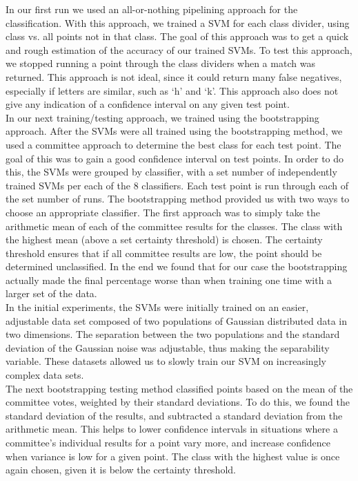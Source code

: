 \documentclass[journal]{IEEEtran}
\begin{document}
In our first run we used an all-or-nothing pipelining approach for the classification.  With this approach, we trained a SVM for each class divider, using class vs. all points not in that class. The goal of this approach was to get a quick and rough estimation of the accuracy of our trained SVMs.  To test this approach, we stopped running a point through the class dividers when a match was returned.  This approach is not ideal, since it could return many false negatives, especially if letters are similar, such as ‘h’ and ‘k’.  This approach also does not give any indication of a confidence interval on any given test point.\\

In our next training/testing approach, we trained using the bootstrapping approach. After the SVMs were all trained using the bootstrapping method, we used a committee approach to determine the best class for each test point.  The goal of this was to gain a good confidence interval on test points.  In order to do this, the SVMs were grouped by classifier, with a set number of  independently trained SVMs per each of the 8 classifiers.  Each test point is run through each of the set number of runs.  The bootstrapping method provided us with two ways to choose an appropriate classifier.  The first approach was to simply take the arithmetic mean of each of the committee results for the classes.  The class with the highest mean (above a set certainty threshold) is chosen.  The certainty threshold ensures that if all committee results are low, the point should be determined unclassified. In the end we found that for our case the bootstrapping actually made the final percentage worse than when training one time with a larger set of the data.\\

In the initial experiments, the SVMs were initially trained on an easier, adjustable data set composed of two populations of Gaussian distributed data in two dimensions. The separation between the two populations and the standard deviation of the Gaussian noise was adjustable, thus making the separability variable. These datasets allowed us to slowly train our SVM on increasingly complex data sets.\\

The next bootstrapping testing method classified points based on the mean of the committee votes, weighted by their standard deviations.  To do this, we found the standard deviation of the results, and subtracted a standard deviation from the arithmetic mean.   This helps to lower confidence intervals in situations where a committee’s individual results for a point vary more, and increase confidence when variance is low for a given point. The class with the highest value is once again chosen, given it is below the certainty threshold.\\
\end{document}
